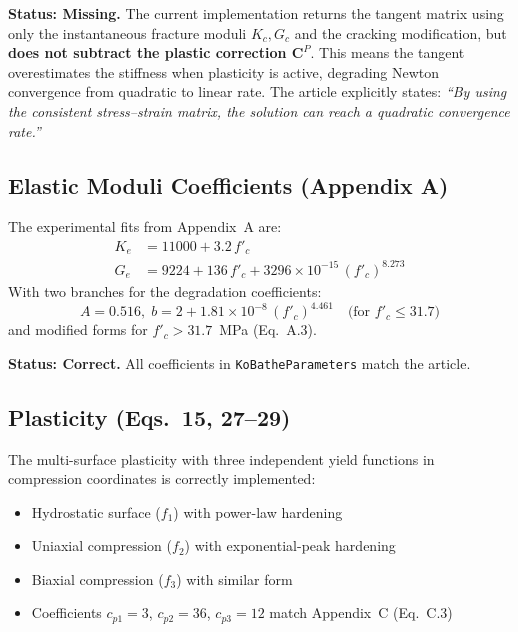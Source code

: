 \textbf{Status: Missing.}  The current implementation returns the
tangent matrix using only the instantaneous fracture moduli $K_c, G_c$
and the cracking modification, but \textbf{does not subtract the
plastic correction $\mathbf{C}^P$}.  This means the tangent
overestimates the stiffness when plasticity is active, degrading
Newton convergence from quadratic to linear rate.  The article
explicitly states: \emph{``By using the consistent stress--strain
matrix, the solution can reach a quadratic convergence rate.''}

\subsection{Elastic Moduli Coefficients (Appendix A)}

The experimental fits from Appendix~A are:
\begin{align}
  K_e &= 11000 + 3.2\, f'_c \label{eq:Ke} \\
  G_e &= 9224 + 136\, f'_c + 3296 \times 10^{-15}\, (f'_c)^{8.273}
  \label{eq:Ge}
\end{align}
With two branches for the degradation coefficients:
\begin{equation}
  A = 0.516,\; b = 2 + 1.81 \times 10^{-8}\, (f'_c)^{4.461}
  \quad \text{(for } f'_c \leq 31.7 \text{)}
  \label{eq:A-b-low}
\end{equation}
and modified forms for $f'_c > 31.7$~MPa (Eq.~A.3).

\textbf{Status: Correct.}  All coefficients in
\texttt{KoBatheParameters} match the article.

\subsection{Plasticity (Eqs.~15, 27--29)}

The multi-surface plasticity with three independent yield functions
in compression coordinates is correctly implemented:
\begin{itemize}
  \item Hydrostatic surface ($f_1$) with power-law hardening
  \item Uniaxial compression ($f_2$) with exponential-peak hardening
  \item Biaxial compression ($f_3$) with similar form
  \item Coefficients $c_{p1} = 3$, $c_{p2} = 36$, $c_{p3} = 12$
    match Appendix~C (Eq.~C.3)
\end{itemize}

